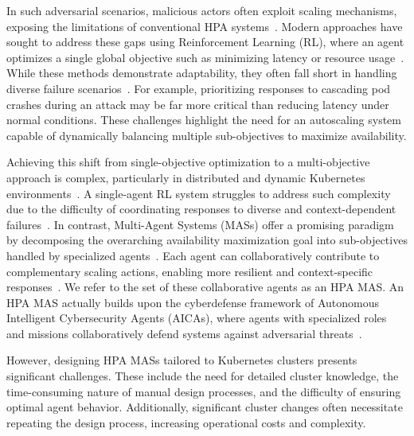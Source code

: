 \documentclass[conference]{IEEEtran}
\begin{document}
In such adversarial scenarios, malicious actors often exploit scaling mechanisms, exposing the limitations of conventional HPA systems~\cite{Kim2020}. Modern approaches have sought to address these gaps using Reinforcement Learning (RL), where an agent optimizes a single global objective such as minimizing latency or resource usage~\cite{Nguyen2019}. While these methods demonstrate adaptability, they often fall short in handling diverse failure scenarios~\cite{Castro2020}. For example, prioritizing responses to cascading pod crashes during an attack may be far more critical than reducing latency under normal conditions. These challenges highlight the need for an autoscaling system capable of dynamically balancing multiple sub-objectives to maximize availability.

Achieving this shift from single-objective optimization to a multi-objective approach is complex, particularly in distributed and dynamic Kubernetes environments~\cite{Shoham2008}. A single-agent RL system struggles to address such complexity due to the difficulty of coordinating responses to diverse and context-dependent failures~\cite{Jennings1998}. In contrast, Multi-Agent Systems (MASs) offer a promising paradigm by decomposing the overarching availability maximization goal into sub-objectives handled by specialized agents~\cite{Shoham2008}. Each agent can collaboratively contribute to complementary scaling actions, enabling more resilient and context-specific responses~\cite{Jennings1998}. We refer to the set of these collaborative agents as an HPA MAS. An HPA MAS actually builds upon the cyberdefense framework of Autonomous Intelligent Cybersecurity Agents (AICAs), where agents with specialized roles and missions collaboratively defend systems against adversarial threats~\cite{Kott2018}.

However, designing HPA MASs tailored to Kubernetes clusters presents significant challenges. These include the need for detailed cluster knowledge, the time-consuming nature of manual design processes, and the difficulty of ensuring optimal agent behavior. Additionally, significant cluster changes often necessitate repeating the design process, increasing operational costs and complexity.
\end{document}
